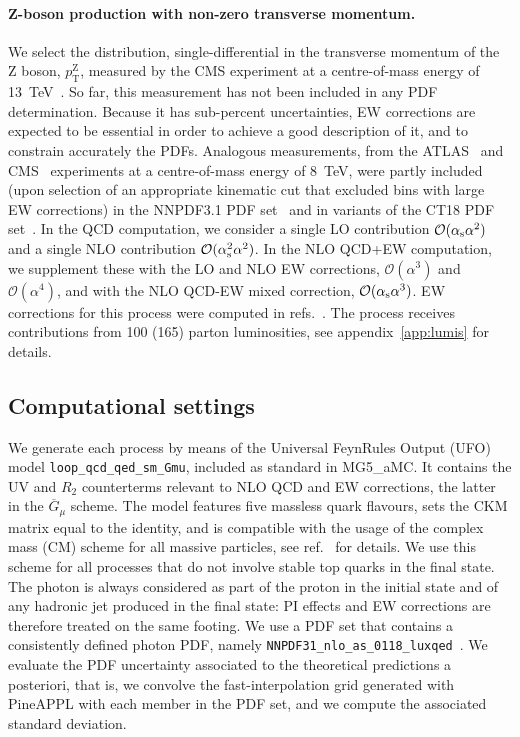 \paragraph{Z-boson production with non-zero transverse momentum.}
We select the distribution, single-differential in the transverse momentum of
the Z boson, $p_\mathrm{T}^\mathrm{Z}$, measured by the CMS experiment at a centre-of-mass
energy of \SI{13}{\tera\electronvolt}~\cite{Sirunyan:2019bzr}. So far, this measurement has not been
included in any PDF determination. Because it has sub-percent uncertainties,
EW corrections are expected to be essential in order to achieve a good
description of it, and to constrain accurately the PDFs. Analogous measurements,
from the ATLAS~\cite{Aad:2015auj} and CMS~\cite{Khachatryan:2015oaa}
experiments at a centre-of-mass energy of \SI{8}{\tera\electronvolt}, were partly included (upon
selection of an appropriate kinematic cut that excluded bins with large EW
corrections) in the NNPDF3.1 PDF set~\cite{Ball:2017nwa} and in variants of
the CT18 PDF set~\cite{Hou:2019efy}. In the QCD computation, we consider a
single LO contribution $\mathcal{O}(\alpha_\mathrm{s}\alpha^2)$ and a single NLO
contribution $\mathcal{O}(\alpha_\mathrm{s}^2\alpha^2)$. In the NLO QCD+EW computation,
we supplement these with the LO and NLO EW corrections,
$\mathcal{O}(\alpha^3)$ and $\mathcal{O}(\alpha^4)$, and with the NLO
QCD-EW mixed correction, $\mathcal{O}(\alpha_\mathrm{s}\alpha^3)$. EW corrections for
this process were computed in
refs.~\cite{Kuhn:2005az,Denner:2011vu,Hollik:2015pja,Kallweit:2015dum}.
The process receives contributions from 100 (165) parton luminosities,
see appendix~\ref{app:lumis} for details.

\subsection{Computational settings}
\label{subsec:computational_settings}

We generate each process by means of the Universal FeynRules Output
(UFO)~\cite{Degrande:2011ua} model {\tt loop\_qcd\_qed\_sm\_Gmu},
included as standard in {\sc MG5\_aMC}. It contains the UV and $R_2$
counterterms relevant to NLO QCD and EW corrections, the latter in the
$\overline{G}_\mu$ scheme. The model features five massless quark flavours,
sets the CKM matrix equal to the identity, and is compatible with the usage of
the complex mass (CM) scheme for all massive particles, see
ref.~\cite{Frederix:2018nkq} for details. We use this scheme
for all processes that do not involve stable top quarks in the final state.
The photon is always considered as part of the proton in the initial state and
of any hadronic jet produced in the final state: PI effects and EW corrections
are therefore treated on the same footing. We use a PDF set that contains a
consistently defined photon PDF, namely
{\tt NNPDF31\_nlo\_as\_0118\_luxqed}~\cite{Bertone:2017bme}. We evaluate the PDF
uncertainty associated to the theoretical predictions a posteriori, that is,
we convolve the fast-interpolation grid generated with {\sc PineAPPL} with
each member in the PDF set, and we compute the associated standard deviation.

